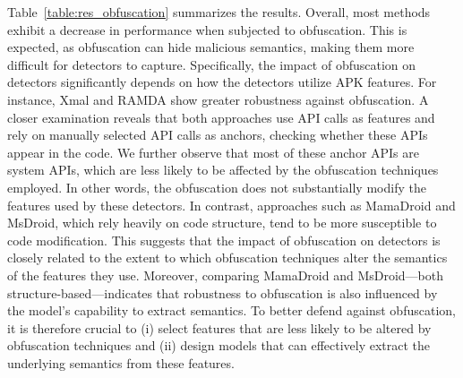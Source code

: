 Table~\ref{table:res_obfuscation} summarizes the results.
Overall, most methods exhibit a decrease in performance when subjected to obfuscation.
This is expected, as obfuscation can hide malicious semantics, making them more difficult for detectors to capture. 
Specifically, the impact of obfuscation on detectors significantly depends on how the detectors utilize APK features.
For instance, Xmal and RAMDA show greater robustness against obfuscation.
A closer examination reveals that both approaches use API calls as features and rely on manually selected API calls as anchors, checking whether these APIs appear in the code.
We further observe that most of these anchor APIs are system APIs, which are less likely to be affected by the obfuscation techniques employed.
In other words, the obfuscation does not substantially modify the features used by these detectors.
In contrast, approaches such as MamaDroid and MsDroid, which rely heavily on code structure, tend to be more susceptible to code modification.
This suggests that the impact of obfuscation on detectors is closely related to the extent to which obfuscation techniques alter the semantics of the features they use.
Moreover, comparing MamaDroid and MsDroid—both structure-based—indicates that robustness to obfuscation is also influenced by the model's capability to extract semantics.
To better defend against obfuscation, it is therefore crucial to (i) select features that are less likely to be altered by obfuscation techniques and (ii) design models that can effectively extract the underlying semantics from these features.

